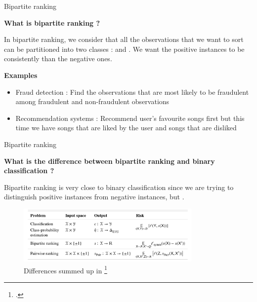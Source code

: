 \begin{frame}{Bipartite ranking}

    {\large\textbf{What is bipartite ranking ?}}
    
    In bipartite ranking, we consider that all the observations that we want to sort can be partitioned into two classes :  and . We want the positive instances to be consistently  than the negative ones.
    
    \vspace{0.3cm}

    {\large\textbf{Examples}}
    
    \begin{itemize}
        \item Fraud detection : Find the observations that are most likely to be fraudulent among fraudulent and non-fraudulent observations
        \item Recommendation systems : Recommend user's favourite songs first but this time we have songs that are liked by the user and songs that are disliked
    \end{itemize}
\end{frame}

\begin{frame}{Bipartite ranking}

    {\large\textbf{What is the difference between bipartite ranking and binary classification ?}}

    Bipartite ranking is very close to binary classification since we are trying to distinguish positive instances from negative instances, but . %

    \begin{figure}
        \centering
        \includegraphics[width=0.8\textwidth]{images/summary.png}
        \caption{Differences summed up in \footcite{menon2016bipartite}}
    \end{figure}
    
\end{frame}

